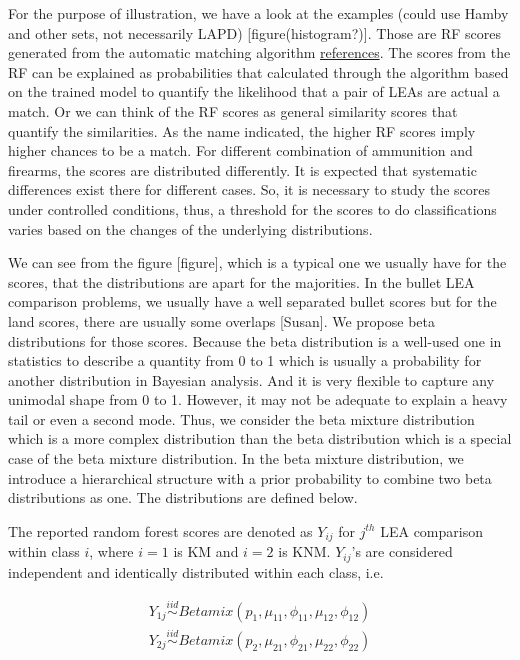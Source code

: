 \documentclass[]{elsarticle} %
\begin{document}
For the purpose of illustration, we have a look at the examples (could
use Hamby and other sets, not necessarily LAPD)
{[}figure(histogram?){]}. Those are RF scores generated from the
automatic matching algorithm \protect\hyperlink{references}{references}.
The scores from the RF can be explained as probabilities that calculated
through the algorithm based on the trained model to quantify the
likelihood that a pair of LEAs are actual a match. Or we can think of
the RF scores as general similarity scores that quantify the
similarities. As the name indicated, the higher RF scores imply higher
chances to be a match. For different combination of ammunition and
firearms, the scores are distributed differently. It is expected that
systematic differences exist there for different cases. So, it is
necessary to study the scores under controlled conditions, thus, a
threshold for the scores to do classifications varies based on the
changes of the underlying distributions.

We can see from the figure {[}figure{]}, which is a typical one we
usually have for the scores, that the distributions are apart for the
majorities. In the bullet LEA comparison problems, we usually have a
well separated bullet scores but for the land scores, there are usually
some overlaps {[}Susan{]}. We propose beta distributions for those
scores. Because the beta distribution is a well-used one in statistics
to describe a quantity from 0 to 1 which is usually a probability for
another distribution in Bayesian analysis. And it is very flexible to
capture any unimodal shape from 0 to 1. However, it may not be adequate
to explain a heavy tail or even a second mode. Thus, we consider the
beta mixture distribution which is a more complex distribution than the
beta distribution which is a special case of the beta mixture
distribution. In the beta mixture distribution, we introduce a
hierarchical structure with a prior probability to combine two beta
distributions as one. The distributions are defined below.

The reported random forest scores are denoted as \(Y_{ij}\) for
\(j^{th}\) LEA comparison within class \(i\), where \(i = 1\) is KM and
\(i = 2\) is KNM. \(Y_{ij}\)'s are considered independent and
identically distributed within each class, i.e.

\begin{align*}
Y_{1j} \stackrel{iid}{\sim}  Betamix(p_1, \mu_{11}, \phi_{11}, \mu_{12}, \phi_{12})\\
Y_{2j} \stackrel{iid}{\sim}  Betamix(p_2, \mu_{21}, \phi_{21}, \mu_{22}, \phi_{22})
\end{align*}
\end{document}
